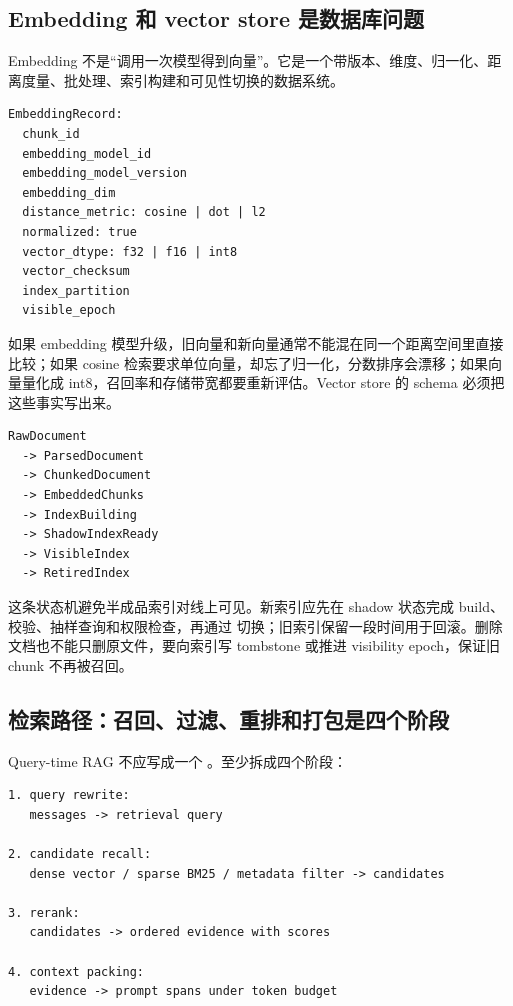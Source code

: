 \subsection{Embedding 和 vector store 是数据库问题}

Embedding 不是“调用一次模型得到向量”。它是一个带版本、维度、归一化、距离度量、批处理、索引构建和可见性切换的数据系统。

\begin{lstlisting}[numbers=none,caption={EmbeddingRecord 最小字段}]
EmbeddingRecord:
  chunk_id
  embedding_model_id
  embedding_model_version
  embedding_dim
  distance_metric: cosine | dot | l2
  normalized: true
  vector_dtype: f32 | f16 | int8
  vector_checksum
  index_partition
  visible_epoch
\end{lstlisting}

如果 embedding 模型升级，旧向量和新向量通常不能混在同一个距离空间里直接比较；如果 cosine 检索要求单位向量，却忘了归一化，分数排序会漂移；如果向量量化成 int8，召回率和存储带宽都要重新评估。Vector store 的 schema 必须把这些事实写出来。

\begin{lstlisting}[numbers=none,caption={IndexBuild 状态机}]
RawDocument
  -> ParsedDocument
  -> ChunkedDocument
  -> EmbeddedChunks
  -> IndexBuilding
  -> ShadowIndexReady
  -> VisibleIndex
  -> RetiredIndex
\end{lstlisting}

这条状态机避免半成品索引对线上可见。新索引应先在 shadow 状态完成 build、校验、抽样查询和权限检查，再通过  切换；旧索引保留一段时间用于回滚。删除文档也不能只删原文件，要向索引写 tombstone 或推进 visibility epoch，保证旧 chunk 不再被召回。

\subsection{检索路径：召回、过滤、重排和打包是四个阶段}

Query-time RAG 不应写成一个 。至少拆成四个阶段：

\begin{lstlisting}[numbers=none,caption={RAG query pipeline}]
1. query rewrite:
   messages -> retrieval query

2. candidate recall:
   dense vector / sparse BM25 / metadata filter -> candidates

3. rerank:
   candidates -> ordered evidence with scores

4. context packing:
   evidence -> prompt spans under token budget
\end{lstlisting}

